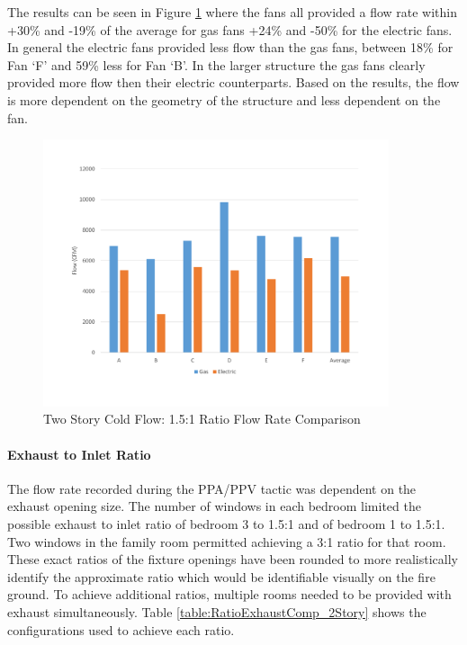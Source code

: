 \documentclass{article}
\begin{document}
The results can be seen in Figure \ref{fig:1_1RatioOutTwoStory} where the fans all provided a flow rate within +30\% and -19\% of the average for gas fans +24\% and -50\% for the electric fans. In general the electric fans provided less flow than the gas fans, between 18\% for Fan `F' and 59\% less for Fan `B'.  In the larger structure the gas fans clearly provided more flow then their electric counterparts. Based on the results, the flow is more dependent on the geometry of the structure and less dependent on the fan. 

\begin{figure}[H]
	\centering
	\includegraphics[width=4in]{0_Images/ColdFlow/Two_Story/1_1Ratio.pdf}
	\caption{Two Story Cold Flow: 1.5:1 Ratio Flow Rate Comparison}
	\label{fig:1_1RatioOutTwoStory}
\end{figure}


\paragraph{Exhaust to Inlet Ratio} \mbox{}

The flow rate recorded during the PPA/PPV tactic was dependent on the exhaust opening size. The number of windows in each bedroom limited the possible exhaust to inlet ratio of bedroom 3 to 1.5:1 and of bedroom 1 to 1.5:1.  Two windows in the family room permitted achieving a 3:1 ratio for that room. These exact ratios of the fixture openings have been rounded to more realistically identify the approximate ratio which would be identifiable visually on the fire ground. To achieve additional ratios, multiple rooms needed to be provided with exhaust simultaneously. Table \ref{table:RatioExhaustComp_2Story} shows the configurations used to achieve each ratio.
\end{document}
